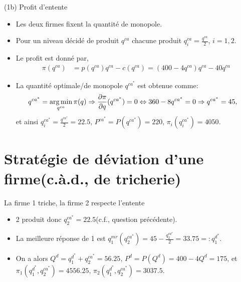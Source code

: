 \begin{frame}[allowframebreaks]{(1b) Profit d'entente}
    \begin{itemize}
        \item Les deux firmes fixent la quantité de monopole.
        \item Pour un niveau décidé de produit $q^{ca}$ chacune produit $q_i^{ca} = \frac{q^{ca}}{2}$, $i=1, 2$.
        \item Le profit est donné par,
        \begin{align*}
            \pi(q^{ca}) &= p(q^{ca})q^{ca} - c(q^{ca}) = (400-4q^{ca})q^{ca} - 40q^{ca}
        \end{align*}
        \item La quantité optimale/de monopole $q^{ca^*}$ est obtenue comme:
        \begin{align*}
            q^{ca^*} &=\argmin_{q^{ca}}  \pi(q) \Rightarrow \frac{\partial \pi}{\partial q}( q^{ca^*}) = 0 
            \Leftrightarrow 360 -8  q^{ca^*} = 0  \Rightarrow q^{ca^*} = 45,
        \end{align*}
        et ainsi $q_i^{ca^*} =  \frac{q^{ca^*}}{2} = 22.5$,  $P^{ca^*} = P(q^{ca^*}) = 220$, $\pi_i(q_i^{ca^*}) = 4050$.
    \end{itemize}
\end{frame}    

\section{Stratégie de déviation d'une firme(c.à.d., de tricherie)}
\frame{\sectionpage}

\begin{frame}[allowframebreaks]{La firme 1 triche, la firme 2 respecte l'entente}
\begin{itemize}
    \item 2 produit donc $q_2^{ca^*} = 22.5$(c.f., question précédente).  
    \item La meilleure réponse de 1 est $q^{mr}_1(q_2^{ca^*}) = 45 - \frac{q_2^{ca^*}}{2} = 33.75=: q_1^{d^*}$.
    \item On a alors $Q^{d} = q_1^{d^*} + q_2^{ca^*}  = 56.25$, $P^d = P(Q^{d}) = 400 - 4 Q^{d} = 175$, et 
    $\pi_1(q_1^{d^*}, q_2^{ca^*} ) = 4556.25$, $\pi_2(q_1^{d^*}, q_2^{ca^*} ) = 3037.5$.
\end{itemize}
\end{frame}

